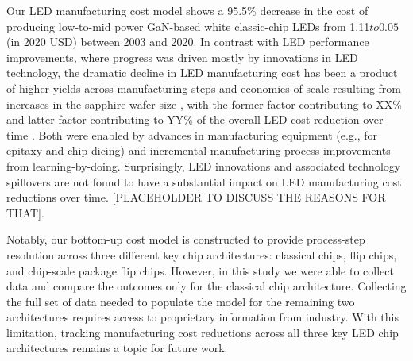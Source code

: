 \documentclass[parskip=full]{article}
\begin{document}
Our LED manufacturing cost model shows a 95.5\% decrease in the cost of producing low-to-mid power GaN-based white classic-chip LEDs from 1.11$ to 0.05$ (in 2020 USD) between 2003 and 2020. In contrast with LED performance improvements, where progress was driven mostly by innovations in LED technology, the dramatic decline in LED manufacturing cost has been a product of higher yields across manufacturing steps and economies of scale resulting from increases in the sapphire wafer size , with the former factor contributing to XX\% and latter factor contributing to YY\% of the overall LED cost reduction over time . Both were enabled by advances in manufacturing equipment (e.g., for epitaxy and chip dicing) and incremental manufacturing process improvements from learning-by-doing.  Surprisingly, LED innovations and associated technology spillovers are not found to have a substantial impact on LED manufacturing cost reductions over time. [PLACEHOLDER TO DISCUSS THE REASONS FOR THAT].

Notably, our bottom-up cost model is constructed to provide process-step resolution across three different key chip architectures: classical chips, flip chips, and chip-scale package flip chips. However, in this study we were able to collect data and compare the outcomes only for the classical chip architecture. Collecting the full set of data needed to populate the model for the remaining two architectures requires access to proprietary information from industry. With this limitation, tracking manufacturing cost reductions across all three key LED chip architectures remains a topic for future work.
\end{document}
